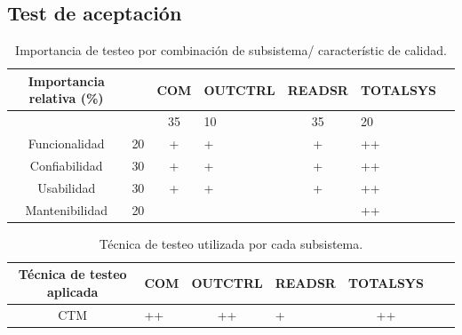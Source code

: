 \documentclass[11pt]{article}
\begin{document}
\subsection{Test de aceptación}
\FloatBarrier
\begin{table}[!ht]
    \centering
    \begin{tabularx}{\linewidth}{@{}|c|X|c|X|c|X|c|@{}}\hline \hline
        \rowcolor[HTML]{d6c6c3}
        Importancia relativa (\%) &    & COM & OUTCTRL & READSR & TOTALSYS \\
        \hline

                                  &    & 35  & 10      & 35     & 20       \\
        Funcionalidad             & 20 & +   & +       & +      & ++       \\
        Confiabilidad             & 30 & +   & +       & +      & ++       \\
        Usabilidad                & 30 & +   & +       & +      & ++       \\
        Mantenibilidad            & 20 &     &         &        & ++       \\
        \hline
    \end{tabularx}
    \caption{Importancia de testeo por combinación de subsistema/ característic
        de calidad.}
\end{table}

\FloatBarrier
\begin{table}[!ht]
    \centering
    \begin{tabularx}{\linewidth}{@{}|c|X|c|X|c|X|c|@{}}\hline \hline
        \rowcolor[HTML]{d6c6c3}
        Técnica de testeo aplicada & COM & OUTCTRL & READSR & TOTALSYS \\
        \hline
        CTM                        & ++  & ++      & +      & ++       \\
        \hline
    \end{tabularx}
    \caption{Técnica de testeo utilizada por cada subsistema.}
\end{table}
\newpage
\end{document}
